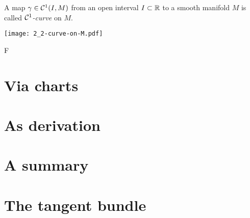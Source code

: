 \textcolor{red}{\hrulefill}

A map $\gamma\in\mathcal{C}^1(I, M)$ from an open interval $I\subset\mathbb{R}$ to a smooth manifold $M$ is called \emph{$\mathcal{C}^1$-curve} on $M$.
\begin{marginfigure}
  \texttt{[image: 2\_2-curve-on-M.pdf]}
\end{marginfigure}
F
\section{Via charts}
\section{As derivation}

\section{A summary}

\section{The tangent bundle}